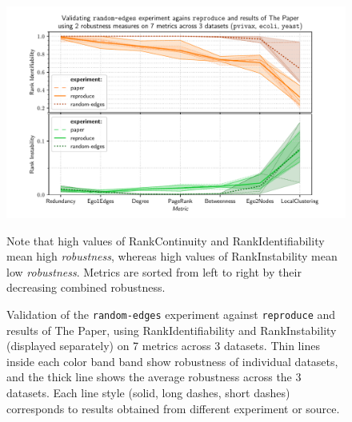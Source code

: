 \begin{figure}
    \includegraphics[width=\linewidth]{plot_random_edges.pdf}
    \caption{Validation of the \texttt{random-edges} experiment against \texttt{reproduce} and results of The Paper, using RankIdentifiability and RankInstability (displayed separately) on 7 metrics across 3 datasets.
    Thin lines inside each color band band show robustness of individual datasets, and the thick line shows the average robustness across the 3 datasets.
    Each line style (solid, long dashes, short dashes) corresponds to results obtained from different experiment or source.}
    \label{fig:plot_random_edges}
    \footnotesize
    \begin{flushleft}
        Note that high values of RankContinuity and RankIdentifiability mean high \textsl{robustness}, whereas high values of RankInstability mean low \textsl{robustness}.
        Metrics are sorted from left to right by their decreasing combined robustness.
    \end{flushleft}
\end{figure}
